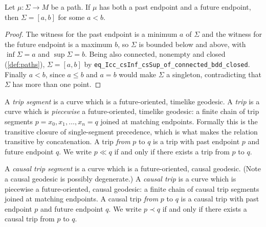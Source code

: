 \begin{lemma}
    \label{lmm:endpoint-parameter-space-eq-Icc}
    Let $\mu : \Sigma \to M$ be a path. If $\mu$ has both a past endpoint and a future endpoint, then $\Sigma = [a,b]$ for some $a < b$.
\end{lemma}
\begin{proof}
    The witness for the past endpoint is a minimum $a$ of $\Sigma$ and the witness for the future endpoint is a maximum $b$, so $\Sigma$ is bounded below and above, with $\inf\Sigma = a$ and $\sup\Sigma = b$. Being also connected, nonempty and closed (\ref{def:paths}), $\Sigma = [a,b]$ by \texttt{eq\_Icc\_csInf\_csSup\_of\_connected\_bdd\_closed}. Finally $a < b$, since $a \le b$ and $a = b$ would make $\Sigma$ a singleton, contradicting that $\Sigma$ has more than one point.
\end{proof}

\begin{definition}[Trip]
    \label{def:trip}
    \leanok
    A \textit{trip segment} is a curve which is a future-oriented, timelike geodesic. A \textit{trip} is a curve which is \emph{piecewise} a future-oriented, timelike geodesic: a finite chain of trip segments $p = x_0, x_1, \dots, x_n = q$ joined at matching endpoints. Formally this is the transitive closure of single-segment precedence, which is what makes the relation transitive by concatenation. A trip \textit{from} $p$ to $q$ is a trip with past endpoint $p$ and future endpoint $q$. We write $p \ll q$ if and only if there exists a trip from $p$ to $q$.
\end{definition}

\begin{definition}
    \label{def:causal-trip}
    \leanok
    A \textit{causal trip segment} is a curve which is a future-oriented, causal geodesic. (Note a causal geodesic is possibly degenerate.) A \textit{causal trip} is a curve which is piecewise a future-oriented, causal geodesic: a finite chain of causal trip segments joined at matching endpoints. A causal trip \textit{from} $p$ to $q$ is a causal trip with past endpoint $p$ and future endpoint $q$. We write $p \prec q$ if and only if there exists a causal trip from $p$ to $q$.
\end{definition}


